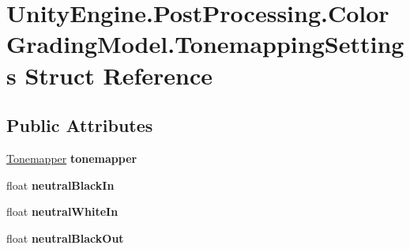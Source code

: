 \hypertarget{struct_unity_engine_1_1_post_processing_1_1_color_grading_model_1_1_tonemapping_settings}{}\section{Unity\+Engine.\+Post\+Processing.\+Color\+Grading\+Model.\+Tonemapping\+Settings Struct Reference}
\label{struct_unity_engine_1_1_post_processing_1_1_color_grading_model_1_1_tonemapping_settings}
\subsection*{Public Attributes}
\begin{DoxyCompactItemize}
\item 
\mbox{\label{struct_unity_engine_1_1_post_processing_1_1_color_grading_model_1_1_tonemapping_settings_a96a7b7dcb0a6d40679501271d965f550}} 
\hyperlink{class_unity_engine_1_1_post_processing_1_1_color_grading_model_a4955bb9dfed7e27c93e7493ff66f3de6}{Tonemapper} {\bfseries tonemapper}
\item 
\mbox{\label{struct_unity_engine_1_1_post_processing_1_1_color_grading_model_1_1_tonemapping_settings_a449e4735503e3a9074f1c7e59cf899ac}} 
float {\bfseries neutral\+Black\+In}
\item 
\mbox{\label{struct_unity_engine_1_1_post_processing_1_1_color_grading_model_1_1_tonemapping_settings_a8eeb01f595de7c751e7b99967aece296}} 
float {\bfseries neutral\+White\+In}
\item 
\mbox{\label{struct_unity_engine_1_1_post_processing_1_1_color_grading_model_1_1_tonemapping_settings_a81e19642855ceb6cfbd08e6726d1bc96}} 
float {\bfseries neutral\+Black\+Out}
\item 
\mbox{\label{struct_unity_engine_1_1_post_processing_1_1_color_grading_model_1_1_tonemapping_settings_a6e3b523ad9572827ac0e5aea8b96cb4c}} 

\end{DoxyCompactItemize}
